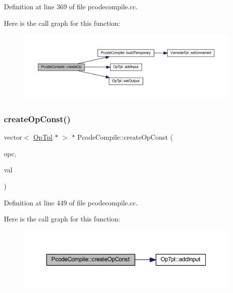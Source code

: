 Definition at line 369 of file pcodecompile.\+cc.

Here is the call graph for this function\+:
\nopagebreak
\begin{figure}[H]
\begin{center}
\leavevmode
\includegraphics[width=350pt]{class_pcode_compile_a7631ae95d4326f458cfea9825bd2f1af_cgraph}
\end{center}
\end{figure}
\mbox{\label{class_pcode_compile_a7579aea93806ec664ec710caa1c7538b}} 
\subsubsection{\texorpdfstring{createOpConst()}{createOpConst()}}
{\footnotesize\ttfamily vector$<$ \mbox{\hyperlink{class_op_tpl}{Op\+Tpl}} $\ast$ $>$ $\ast$ Pcode\+Compile\+::create\+Op\+Const (\begin{DoxyParamCaption}\item[{\mbox{\hyperlink{opcodes_8hh_abeb7dfb0e9e2b3114e240a405d046ea7}{Op\+Code}}}]{opc,  }\item[{\mbox{\hyperlink{types_8h_a2db313c5d32a12b01d26ac9b3bca178f}{uintb}}}]{val }\end{DoxyParamCaption})}



Definition at line 449 of file pcodecompile.\+cc.

Here is the call graph for this function\+:
\nopagebreak
\begin{figure}[H]
\begin{center}
\leavevmode
\includegraphics[width=350pt]{class_pcode_compile_a7579aea93806ec664ec710caa1c7538b_cgraph}
\end{center}
\end{figure}
\mbox{\label{class_pcode_compile_a0d195a0f919ee62221a5c01bbfbe713c}} 
